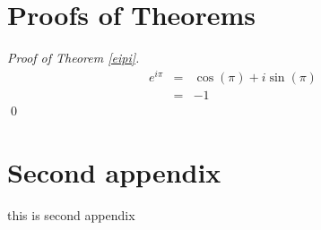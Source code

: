 \chapter{Proofs of Theorems}\label{AppA}
\begin{proof}[Proof of Theorem \ref{eipi}]
\begin{eqnarray}
e^{i\pi} &=& \cos(\pi) + i\sin(\pi)\\
&=& -1
\end{eqnarray} \qed
\end{proof}

\chapter{Second appendix}
this is second appendix
